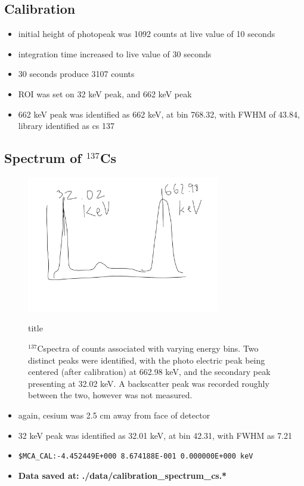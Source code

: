 \documentclass[a4paper]{article}
\begin{document}
\subsection{Calibration}
\begin{itemize}
    \item initial height of photopeak was 1092 counts at live value of 10 seconds
    \item integration time increased to live value of 30 seconds
    \item 30 seconds produce 3107 counts
    \item ROI was set on 32 keV peak, and 662 keV peak
    \item 662 keV peak was identified as 662 keV, at bin 768.32, with FWHM of 43.84, library identified as cs 137
\end{itemize}

\subsection{Spectrum of $^{137}$Cs}
\begin{figure}[H]
    \centering
    \includegraphics[width=0.75\textwidth]{figures/cesium_137_counts.pdf}
    \caption{$^{137}$Cspectra of counts associated with varying energy bins. Two distinct peaks were identified, with the photo electric peak being centered (after calibration) at 662.98 keV, and the secondary peak presenting at 32.02 keV. A backscatter peak was recorded roughly between the two, however was not measured.}title
\end{figure}
\begin{itemize}
    \item again, cesium was 2.5 cm away from face of detector
    \item 32 keV peak was identified as 32.01 keV, at bin 42.31, with FWHM as 7.21
    \item \verb|$MCA_CAL:-4.452449E+000 8.674188E-001 0.000000E+000 keV|
    \item \textbf{Data saved at: ./data/calibration\_spectrum\_cs.*}
\end{itemize}
\end{document}
